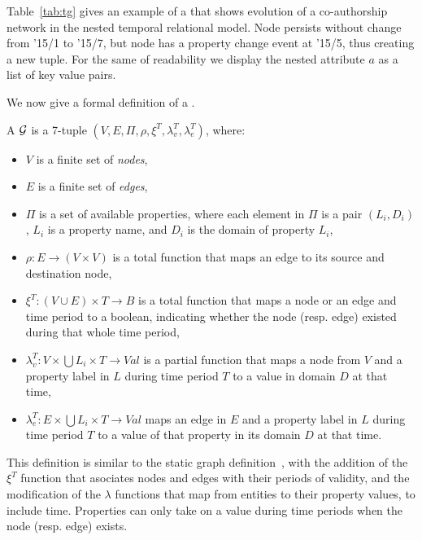 Table~\ref{tab:tg} gives an example of a \tg that shows evolution of a
co-authorship network in the nested temporal relational model.  Node
 persists without change from '15/1 to '15/7, but node
 has a property change event at '15/5, thus creating a new
tuple.  For the same of readability we display the nested attribute
$a$ as a list of key value pairs.

We now give a formal definition of a \tg.

\begin{definition}[TGraph]
\label{def:tg1}
A \tg $\mathcal{G}$ is a 7-tuple \break $(V,E,\Pi,\rho,\xi^T,\lambda^T_v,\lambda^T_e)$, where:

\begin{itemize}[noitemsep,itemindent=\dimexpr{}+\relax,leftmargin=5pt]
\item $V$ is a finite set of {\em nodes},
\item $E$ is a finite set of {\em edges},
\item $\Pi$ is a set of available properties, where each element in $\Pi$ is a pair $(L_i,D_i)$, $L_i$ is a property name, and $D_i$ is the domain of property $L_i$,
\item $\rho: E \to (V \times V)$ is a total function that maps an edge to its source and destination node,
\item $\xi^T: (V \cup E) \times T \to B$ is a total function that maps a node or an edge and time period to a boolean, indicating whether the node (resp. edge) existed during that whole time period,
\item $\lambda^T_v: V \times \bigcup L_i \times T \to Val$ is a partial function that maps a node from $V$ and a property label in $L$ during time period $T$ to a value in domain $D$ at that time,
\item $\lambda^T_e: E \times \bigcup L_i \times T \to Val$ maps an edge in $E$ and a property label in $L$ during time period $T$ to a value of that property in its domain $D$ at that time.
\end{itemize}
\end{definition}

This definition is similar to the static graph
definition~\cite{DBLP:journals/corr/AnglesABHRV16}, with the addition
of the $\xi^T$ function that asociates nodes and edges with their
periods of validity, and the modification of the $\lambda$ functions
that map from entities to their property values, to include time.
Properties can only take on a value during time periods when the node
(resp. edge) exists.

